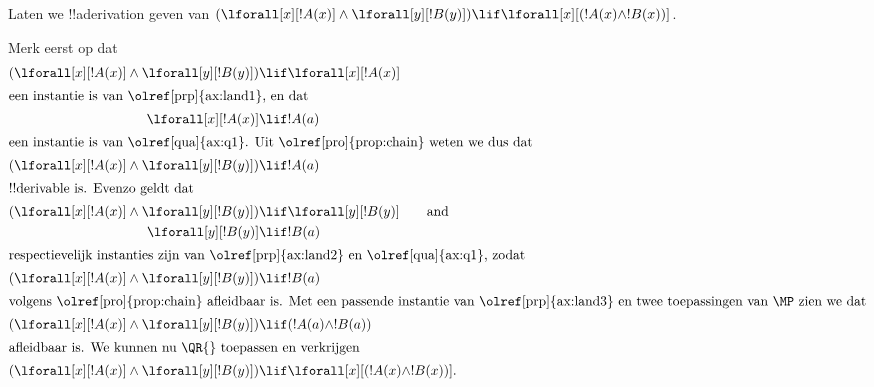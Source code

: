 \documentclass[openany]{memoir}
\begin{document}
\begingroup
\def\olfilename{OLP-0117}
\def\olfilepath{content/first-order-logic/axiomatic-deduction/}
\hypertarget{unit-OLP-0117}{}





\begin{ex}
Laten we !!a{derivation} geven van $(\lforall[x][!A(x)] \land
\lforall[y][!B(y)]) \lif \lforall[x][(!A(x) \land !B(x))]$.

Merk eerst op dat
\begin{align*}
  (\lforall[x][!A(x)] \land \lforall[y][!B(y)]) & \lif \lforall[x][!A(x)]\\
  \intertext{een instantie is van \olref[prp]{ax:land1}, en dat}
  \lforall[x][!A(x)] & \lif !A(a) \\
  \intertext{een instantie is van \olref[qua]{ax:q1}. Uit \olref[pro]{prop:chain} weten we dus dat}
  (\lforall[x][!A(x)] \land \lforall[y][!B(y)]) & \lif !A(a) \\
  \intertext{!!{derivable} is. Evenzo geldt dat}
  (\lforall[x][!A(x)] \land \lforall[y][!B(y)]) & \lif \lforall[y][!B(y)] \qquad\text{and}\\
    \lforall[y][!B(y)] & \lif !B(a)\\
    \intertext{respectievelijk instanties zijn van \olref[prp]{ax:land2} en \olref[qua]{ax:q1}, zodat}
    (\lforall[x][!A(x)] \land \lforall[y][!B(y)]) & \lif !B(a)\\
    \intertext{volgens \olref[pro]{prop:chain} afleidbaar is. Met een passende instantie van \olref[prp]{ax:land3} en twee toepassingen van~\MP zien we dat}
    (\lforall[x][!A(x)] \land \lforall[y][!B(y)]) & \lif (!A(a) \land !B(a))\\
    \intertext{afleidbaar is. We kunnen nu \QR{} toepassen en verkrijgen}
(\lforall[x][!A(x)] \land \lforall[y][!B(y)]) & \lif \lforall[x][(!A(x) \land !B(x))].
\end{align*}
\end{ex}
\endgroup
\end{document}
